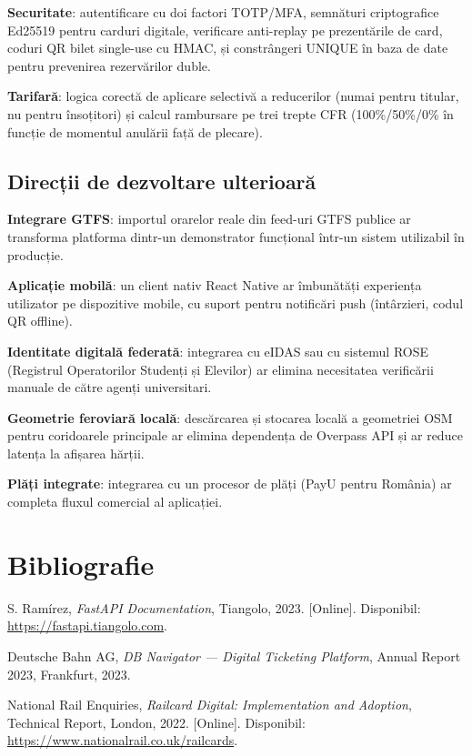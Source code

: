 \documentclass[12pt,a4paper]{report}
\begin{document}
\textbf{Securitate}: autentificare cu doi factori TOTP/MFA, semnături criptografice Ed25519 pentru carduri digitale, verificare anti-replay pe prezentările de card, coduri QR bilet single-use cu HMAC, și constrângeri UNIQUE în baza de date pentru prevenirea rezervărilor duble.

\textbf{Tarifară}: logica corectă de aplicare selectivă a reducerilor (numai pentru titular, nu pentru însoțitori) și calcul rambursare pe trei trepte CFR (100\%/50\%/0\% în funcție de momentul anulării față de plecare).

\section{Direcții de dezvoltare ulterioară}

\textbf{Integrare GTFS}: importul orarelor reale din feed-uri GTFS publice ar transforma platforma dintr-un demonstrator funcțional într-un sistem utilizabil în producție.

\textbf{Aplicație mobilă}: un client nativ React Native ar îmbunătăți experiența utilizator pe dispozitive mobile, cu suport pentru notificări push (întârzieri, codul QR offline).

\textbf{Identitate digitală federată}: integrarea cu eIDAS sau cu sistemul ROSE (Registrul Operatorilor Studenți și Elevilor) ar elimina necesitatea verificării manuale de către agenți universitari.

\textbf{Geometrie feroviară locală}: descărcarea și stocarea locală a geometriei OSM pentru coridoarele principale ar elimina dependența de Overpass API și ar reduce latența la afișarea hărții.

\textbf{Plăți integrate}: integrarea cu un procesor de plăți (PayU pentru România) ar completa fluxul comercial al aplicației.


\chapter*{Bibliografie}

S. Ramírez, \textit{FastAPI Documentation}, Tiangolo, 2023.
[Online]. Disponibil: \url{https://fastapi.tiangolo.com}.

Deutsche Bahn AG, \textit{DB Navigator — Digital Ticketing Platform},
Annual Report 2023, Frankfurt, 2023.

National Rail Enquiries, \textit{Railcard Digital: Implementation and Adoption},
Technical Report, London, 2022.
[Online]. Disponibil: \url{https://www.nationalrail.co.uk/railcards}.
\end{document}
